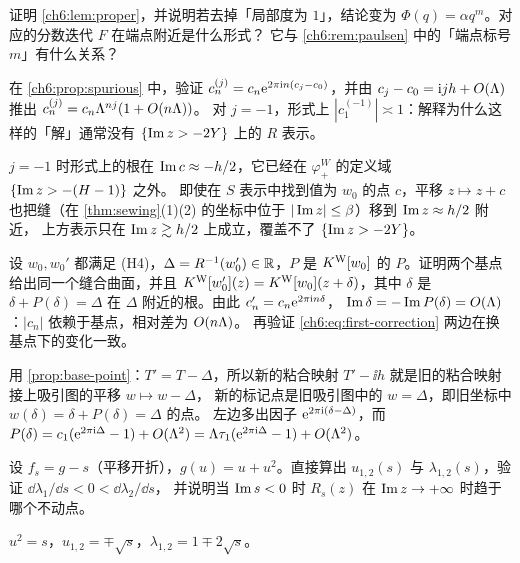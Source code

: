 \begin{exercise}\label{ch6:ex:proper}
证明 \cref{ch6:lem:proper}，并说明若去掉「局部度为 $1$」，结论变为 $\Phi(q)=\alpha q^m$。对应的分数迭代 $F$ 在端点附近是什么形式？
它与 \cref{ch6:rem:paulsen} 中的「端点标号 $m$」有什么关系？
\end{exercise}

\begin{exercise}\label{ch6:ex:spurious}
在 \cref{ch6:prop:spurious} 中，验证 $c_n^{(j)}=c_n\mathrm{e}^{2\pi\mathrm{i} n(c_j-c_0)}$，并由 $c_j-c_0=\mathrm{i} jh+O(\Lambda)$ 推出 $c_n^{(j)}=c_n\Lambda^{nj}(1+O(n\Lambda))$。
对 $j=-1$，形式上 $|c_1^{(-1)}|\asymp1$：解释为什么这样的「解」通常没有 $\{\operatorname{Im} z>-2Y\}$ 上的 $R$ 表示。
\end{exercise}
\begin{hint}
$j=-1$ 时形式上的根在 $\operatorname{Im} c\approx-h/2$，它已经在 $\varphi^W_+$ 的定义域 $\{\operatorname{Im} z>-(H-1)\}$ 之外。
即使在 $S$ 表示中找到值为 $w_0$ 的点 $c$，平移 $z\mapsto z+c$ 也把缝（在 \cref{thm:sewing}(1)(2) 的坐标中位于 $|\operatorname{Im} z|\le\beta$）移到 $\operatorname{Im} z\approx h/2$ 附近，
上方表示只在 $\operatorname{Im} z\gtrsim h/2$ 上成立，覆盖不了 $\{\operatorname{Im} z>-2Y\}$。
\end{hint}

\begin{exercise}\label{ch6:ex:base}
设 $w_0,w_0'$ 都满足 (H4)，$\Delta=R^{-1}(w_0')\in\mathbb{R}$，$P$ 是 $K^{\mathrm W}[w_0]$ 的 $P$。证明两个基点给出同一个缝合曲面，并且
$K^{\mathrm W}[w_0'](z)=K^{\mathrm W}[w_0](z+\delta)$，其中 $\delta$ 是 $\delta+P(\delta)=\Delta$ 在 $\Delta$ 附近的根。由此 $c_n'=c_n\mathrm{e}^{2\pi\mathrm{i} n\delta}$，
$\operatorname{Im}\delta=-\operatorname{Im} P(\delta)=O(\Lambda)$：$|c_n|$ 依赖于基点，相对差为 $O(n\Lambda)$。
再验证 \eqref{ch6:eq:first-correction} 两边在换基点下的变化一致。
\end{exercise}
\begin{hint}
用 \cref{prop:base-point}：$T'=T-\Delta$，所以新的粘合映射 $T'-\ii h$ 就是旧的粘合映射接上吸引图的平移 $w\mapsto w-\Delta$，
新的标记点是旧吸引图中的 $w=\Delta$，即旧坐标中 $w(\delta)=\delta+P(\delta)=\Delta$ 的点。
左边多出因子 $\mathrm{e}^{2\pi\mathrm{i} (\delta-\Delta)}$，而 $P(\delta)=c_1(\mathrm{e}^{2\pi\mathrm{i} \Delta}-1)+O(\Lambda^2)=\Lambda\tau_1(\mathrm{e}^{2\pi\mathrm{i} \Delta}-1)+O(\Lambda^2)$。
\end{hint}

\begin{exercise}\label{ch6:ex:parameter-sign}
设 $f_s=g-s$（平移开折），$g(u)=u+u^2$。直接算出 $u_{1,2}(s)$ 与 $\lambda_{1,2}(s)$，验证 $\dd\lambda_1/\dd s<0<\dd\lambda_2/\dd s$，
并说明当 $\operatorname{Im} s<0$ 时 $R_s(z)$ 在 $\operatorname{Im} z\to+\infty$ 时趋于哪个不动点。
\end{exercise}
\begin{hint}
$u^2=s$，$u_{1,2}=\mp\sqrt s$，$\lambda_{1,2}=1\mp2\sqrt s$。
\end{hint}

